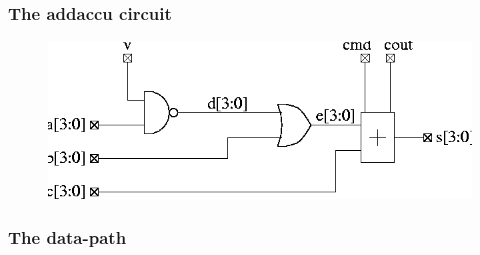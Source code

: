 \subsubsection{The addaccu circuit}

\begin{figure}[h!]
\centering
{}
          {\includegraphics[width=.9\textwidth]{./images/add1.png}}
\end{figure}
  
\newpage
\subsubsection{The data-path}

